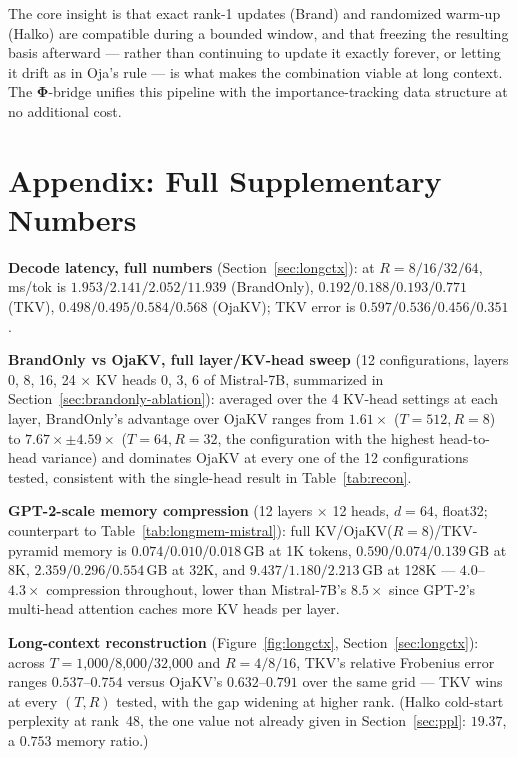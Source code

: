 \documentclass{article}
\let\PhiSymbol\Phi
\renewcommand{\Phi}{\boldsymbol{\PhiSymbol}}
\begin{document}
The core insight is that exact rank-1 updates (Brand) and randomized warm-up
(Halko) are compatible during a bounded window, and that freezing the
resulting basis afterward --- rather than continuing to update it exactly
forever, or letting it drift as in Oja's rule --- is what makes the
combination viable at long context.  The $\Phi$-bridge unifies this
pipeline with the importance-tracking data structure at no additional cost.




\appendix
\section{Appendix: Full Supplementary Numbers}
\label{app:multihead}
\label{app:memory}
\label{app:longctx}
\label{app:ppl}
\label{app:decode}

\textbf{Decode latency, full numbers} (Section~\ref{sec:longctx}): at
$R=8/16/32/64$, ms/tok is $1.953/2.141/2.052/11.939$ (BrandOnly),
$0.192/0.188/0.193/0.771$ (TKV), $0.498/0.495/0.584/0.568$ (OjaKV); TKV
error is $0.597/0.536/0.456/0.351$.

\textbf{BrandOnly vs OjaKV, full layer/KV-head sweep} (12 configurations,
layers 0, 8, 16, 24 $\times$ KV heads 0, 3, 6 of Mistral-7B, summarized in
Section~\ref{sec:brandonly-ablation}): averaged over the 4 KV-head settings
at each layer, BrandOnly's advantage over OjaKV ranges from $1.61\times$
($T{=}512,R{=}8$) to $7.67\times \pm 4.59\times$ ($T{=}64,R{=}32$, the
configuration with the highest head-to-head variance) and dominates OjaKV
at every one of the 12 configurations tested, consistent with the
single-head result in Table~\ref{tab:recon}.

\textbf{GPT-2-scale memory compression} (12 layers $\times$ 12 heads,
$d=64$, float32; counterpart to Table~\ref{tab:longmem-mistral}): full
KV/OjaKV($R{=}8$)/TKV-pyramid memory is $0.074/0.010/0.018$\,GB at 1K
tokens, $0.590/0.074/0.139$\,GB at 8K, $2.359/0.296/0.554$\,GB at 32K, and
$9.437/1.180/2.213$\,GB at 128K --- $4.0$--$4.3\times$ compression
throughout, lower than Mistral-7B's $8.5\times$ since GPT-2's multi-head
attention caches more KV heads per layer.

\textbf{Long-context reconstruction} (Figure~\ref{fig:longctx},
Section~\ref{sec:longctx}): across $T=1\text{,}000/8\text{,}000/32\text{,}000$
and $R=4/8/16$, TKV's relative Frobenius error ranges $0.537$--$0.754$
versus OjaKV's $0.632$--$0.791$ over the same grid --- TKV wins at every
$(T,R)$ tested, with the gap widening at higher rank.  (Halko cold-start
perplexity at rank~48, the one value not already given in
Section~\ref{sec:ppl}: $19.37$, a $0.753$ memory ratio.)
\end{document}
